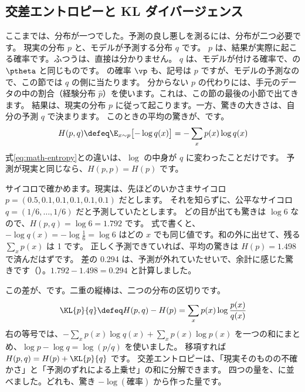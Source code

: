 \subsection*{交差エントロピーと KL ダイバージェンス}

ここまでは、分布が一つでした。予測の良し悪しを測るには、分布が二つ必要です。
現実の分布 $p$ と、モデルが予測する分布 $q$ です。
$p$ は、結果が実際に起こる確率です。ふつうは、直接は分かりません。
$q$ は、モデルが付ける確率で、の $\ptheta$ と同じものです。
の確率 $\vp$ も、記号は $p$ ですが、モデルの予測なので、この節では $q$ の側に当たります。
分からない $p$ の代わりには、手元のデータの中の割合（経験分布 $\hat p$）を使います。これは、この節の最後の小節で出てきます。
結果は、現実の分布 $p$ に従って起こります。一方、驚きの大きさは、自分の予測 $q$ で決まります。
このときの平均の驚きが、です。
\begin{equation}
H(p,q)\defeq\E_{x\sim p}\bigl[-\log q(x)\bigr]=-\sum_{x}p(x)\log q(x)
\label{eq:math-cross-entropy}
\end{equation}
式\eqref{eq:math-entropy}との違いは、$\log$ の中身が $q$ に変わったことだけです。
予測が現実と同じなら、$H(p,p)=H(p)$ です。

サイコロで確かめます。現実は、先ほどのいかさまサイコロ $p=(0.5,0.1,0.1,0.1,0.1,0.1)$ だとします。
それを知らずに、公平なサイコロ $q=(1/6,\dots,1/6)$ だと予測していたとします。
どの目が出ても驚きは $\log 6$ なので、$H(p,q)=\log 6=1.792$ です。
式で書くと、$-\log q(x)=-\log\frac{1}{6}=\log 6$ はどの $x$ でも同じ値です。和の外に出せて、残る $\sum_x p(x)$ は 1 です。
正しく予測できていれば、平均の驚きは $H(p)=1.498$ で済んだはずです。
差の 0.294 は、予測が外れていたせいで、余計に感じた驚きです（）。$1.792-1.498=0.294$ と計算しました。

この差が、です。二重の縦棒は、二つの分布の区切りです。
\begin{equation}
\KL{p}{q}\defeq H(p,q)-H(p)=\sum_{x}p(x)\log\frac{p(x)}{q(x)}
\label{eq:math-kl}
\end{equation}
右の等号では、$-\sum_x p(x)\log q(x)+\sum_x p(x)\log p(x)$ を一つの和にまとめ、$\log p-\log q=\log(p/q)$ を使いました。
移項すれば $H(p,q)=H(p)+\KL{p}{q}$ です。
交差エントロピーは、「現実そのものの不確かさ」と「予測のずれによる上乗せ」の和に分解できます。
四つの量を、に並べました。どれも、驚き $-\log(\text{確率})$ から作った量です。

